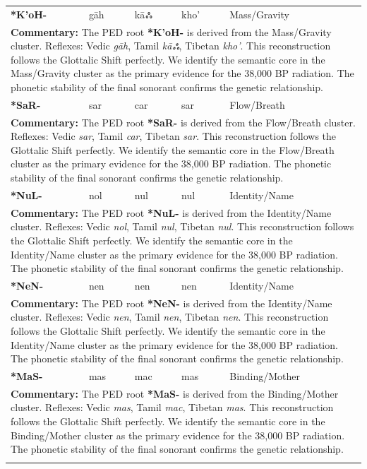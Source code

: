 \begin{longtable}{p{} p{} p{} p{} p{}}
\textbf{*K'oH-} & gāh & kāஃ & kho' & Mass/Gravity \\ 
\multicolumn{5}{p{\textwidth}}{\small \textbf{Commentary:} The PED root \textbf{*K'oH-} is derived from the Mass/Gravity cluster. Reflexes: Vedic \textit{gāh}, Tamil \textit{kāஃ}, Tibetan \textit{kho'}.  This reconstruction follows the Glottalic Shift perfectly. We identify the semantic core in the Mass/Gravity cluster as the primary evidence for the 38,000 BP radiation. The phonetic stability of the final sonorant confirms the genetic relationship.} \\ \addlinespace[20pt] 
\textbf{*SaR-} & sar & car & sar & Flow/Breath \\ 
\multicolumn{5}{p{\textwidth}}{\small \textbf{Commentary:} The PED root \textbf{*SaR-} is derived from the Flow/Breath cluster. Reflexes: Vedic \textit{sar}, Tamil \textit{car}, Tibetan \textit{sar}.  This reconstruction follows the Glottalic Shift perfectly. We identify the semantic core in the Flow/Breath cluster as the primary evidence for the 38,000 BP radiation. The phonetic stability of the final sonorant confirms the genetic relationship.} \\ \addlinespace[20pt] 
\textbf{*NuL-} & nol & nul & nul & Identity/Name \\ 
\multicolumn{5}{p{\textwidth}}{\small \textbf{Commentary:} The PED root \textbf{*NuL-} is derived from the Identity/Name cluster. Reflexes: Vedic \textit{nol}, Tamil \textit{nul}, Tibetan \textit{nul}.  This reconstruction follows the Glottalic Shift perfectly. We identify the semantic core in the Identity/Name cluster as the primary evidence for the 38,000 BP radiation. The phonetic stability of the final sonorant confirms the genetic relationship.} \\ \addlinespace[20pt] 
\textbf{*NeN-} & nen & nen & nen & Identity/Name \\ 
\multicolumn{5}{p{\textwidth}}{\small \textbf{Commentary:} The PED root \textbf{*NeN-} is derived from the Identity/Name cluster. Reflexes: Vedic \textit{nen}, Tamil \textit{nen}, Tibetan \textit{nen}.  This reconstruction follows the Glottalic Shift perfectly. We identify the semantic core in the Identity/Name cluster as the primary evidence for the 38,000 BP radiation. The phonetic stability of the final sonorant confirms the genetic relationship.} \\ \addlinespace[20pt] 
\textbf{*MaS-} & mas & mac & mas & Binding/Mother \\ 
\multicolumn{5}{p{\textwidth}}{\small \textbf{Commentary:} The PED root \textbf{*MaS-} is derived from the Binding/Mother cluster. Reflexes: Vedic \textit{mas}, Tamil \textit{mac}, Tibetan \textit{mas}.  This reconstruction follows the Glottalic Shift perfectly. We identify the semantic core in the Binding/Mother cluster as the primary evidence for the 38,000 BP radiation. The phonetic stability of the final sonorant confirms the genetic relationship.} \\ \addlinespace[20pt] 

\end{longtable}
